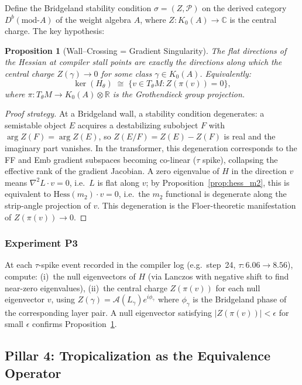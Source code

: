 \documentclass[11pt]{amsart}
\newtheorem{proposition}[theorem]{Proposition}
\begin{document}
Define the Bridgeland stability condition
$\sigma = (Z, \mathcal{P})$ on the derived category
$D^b(\mathrm{mod}\text{-}A)$ of the weight algebra $A$,
where $Z: K_0(A) \to \mathbb{C}$ is the central charge.
The key hypothesis:

\begin{proposition}[Wall--Crossing = Gradient Singularity]
\label{prop:wall_crossing}
The flat directions of the Hessian at compiler stall points are
exactly the directions along which the central charge $Z(\gamma) \to 0$
for some class $\gamma \in K_0(A)$.
Equivalently:
\[
  \ker(H_\theta) \;\cong\;
  \bigl\{ v \in T_\theta M : Z(\pi(v)) = 0 \bigr\},
\]
where $\pi: T_\theta M \to K_0(A) \otimes \mathbb{R}$
is the Grothendieck group projection.
\end{proposition}

\begin{proof}[Proof strategy]
At a Bridgeland wall, a stability condition degenerates:
a semistable object $E$ acquires a destabilizing subobject $F$
with $\arg Z(F) = \arg Z(E)$, so $Z(E/F) = Z(E) - Z(F)$ is
real and the imaginary part vanishes.
In the transformer, this degeneration corresponds to the FF and Emb
gradient subspaces becoming co-linear ($\tau$ spike), collapsing
the effective rank of the gradient Jacobian.
A zero eigenvalue of $H$ in the direction $v$ means
$\nabla^2 L \cdot v = 0$, i.e.\ $L$ is flat along $v$;
by Proposition~\ref{prop:hess_m2}, this is equivalent to
$\mathrm{Hess}(m_2) \cdot v = 0$, i.e.\ the $m_2$ functional
is degenerate along the strip-angle projection of $v$.
This degeneration is the Floer-theoretic manifestation of
$Z(\pi(v)) \to 0$.
\end{proof}

\subsubsection*{Experiment P3}

At each $\tau$-spike event recorded in the compiler log
(e.g.\ step~24, $\tau: 6.06 \to 8.56$), compute:
(i)~the null eigenvectors of $H$ (via Lanczos with negative
shift to find near-zero eigenvalues),
(ii)~the central charge $Z(\pi(v))$ for each null eigenvector $v$,
using $Z(\gamma) = \mathcal{A}(L_\gamma)e^{i\phi_\gamma}$
where $\phi_\gamma$ is the Bridgeland phase of the corresponding
layer pair.
A null eigenvector satisfying $|Z(\pi(v))| < \epsilon$ for
small $\epsilon$ confirms Proposition~\ref{prop:wall_crossing}.

\subsection{Pillar 4: Tropicalization as the Equivalence Operator}
\label{sec:pillar4}
\end{document}
